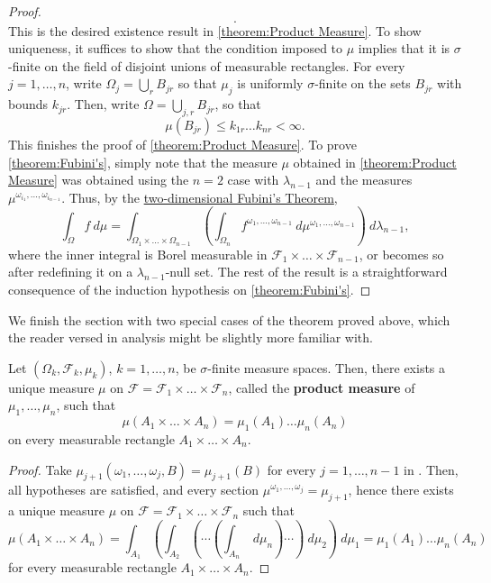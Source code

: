 \begin{proof}
\[.\]
This is the desired existence result in \ref{theorem:Product Measure}. To show uniqueness, it suffices to show that the condition imposed to \(\mu\) implies that it is \(\sigma\)-finite on the field of disjoint unions of measurable rectangles. For every \(j=1,\dots,n\), write \(\Omega_j=\bigcup_{r}B_{jr}\) so that \(\mu_j\) is uniformly \(\sigma\)-finite on the sets \(B_{jr}\) with bounds \(k_{jr}\). Then, write \(\Omega=\bigcup_{j,r}B_{jr}\), so that 
\[
    \mu(B_{jr})\leq k_{1r}\dots k_{nr}<\infty
.\]
This finishes the proof of \ref{theorem:Product Measure}. To prove \ref{theorem:Fubini's}, simply note that the measure \(\mu\) obtained in \ref{theorem:Product Measure} was obtained using the \(n=2\) case with \(\lambda_{n-1}\) and the measures \(\mu^{\omega_{i_{1}}, \dots , \omega_{i_{n-1}}}\). Thus, by the \hyperref[theorem:two-dim Fubini's]{two-dimensional Fubini's Theorem},
\[
    \int_{\Omega}f~d\mu=\int_{\Omega_{1}\times \dots \times \Omega_{n-1}}\left(\int_{\Omega_n}f^{\omega_{1}, \dots , \omega_{n-1}}~d\mu^{\omega_{{1}}, \dots , \omega_{{n-1}}}\right)~d\lambda_{n-1}
,\]
where the inner integral is Borel measurable in \(\mathcal{F}_{1}\times \dots \times \mathcal{F}_{n-1}\), or becomes so after redefining it on a \(\lambda_{n-1}\)-null set. The rest of the result is a straightforward consequence of the induction hypothesis on \ref{theorem:Fubini's}.
\end{proof}
We finish the section with two special cases of the theorem proved above, which the reader versed in analysis might be slightly more familiar with.

\begin{corl}\label{corollary:classical Product Measure}
    Let \(\left(\Omega_k,\mathcal{F}_k,\mu_k\right)\), \(k=1,\dots,n\), be \(\sigma\)-finite
    measure spaces. Then, there exists a unique measure \(\mu\) on \(\mathcal{F}=\mathcal{F}_1\times\dots\times\mathcal{F}_n\), called the \textbf{product measure} of \(\mu_{1}, \dots , \mu_{n}\), such that
    \[
    \mu(A_1\times\dots\times A_n)=\mu_1(A_1)\dots\mu_n(A_n)
    \] 
    on every measurable rectangle \(A_1\times\dots\times A_n\).
\end{corl}
\begin{proof}
    Take \(\mu_{j+1}(\omega_1,\dots,\omega_j,B)=\mu_{j+1}(B)\) for every \(j=1,\dots,n-1\) in . Then, all hypotheses are satisfied, and every section \(\mu^{\omega_1,\dots,\omega_j}=\mu_{j+1}\), hence there exists a unique measure  \(\mu\) on \(\mathcal{F}=\mathcal{F}_1\times\dots\times\mathcal{F}_n \) such that
    \[
        \mu(A_1\times\dots\times A_n)=\int_{A_1}\left(\int_{A_2}\left(\dotsm\left(\int_{A_n}~d\mu_n\right)\dotsm\right)~d\mu_2\right)~d\mu_1=\mu_1(A_1)\dots\mu_n(A_n)
    \]
    for every measurable rectangle \(A_1\times\dots\times A_n\).
\end{proof}


